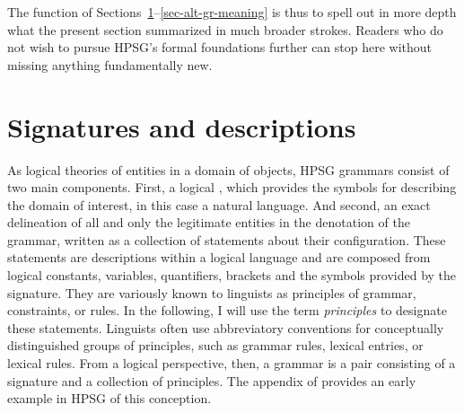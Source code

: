 \documentclass[output=paper,biblatex,babelshorthands,newtxmath,draftmode,colorlinks,citecolor=brown]{langscibook}
\begin{document}
{The function of Sections~\ref{sec-signatures}--\ref{sec-alt-gr-meaning}
is thus to spell out in more depth what the present section summarized
in much broader strokes. Readers who do not wish to pursue HPSG's
formal foundations further
can stop here without missing anything fundamentally new.


\section{Signatures and descriptions}
\label{sec-signatures}

\largerpage[-1]
As logical theories of entities in a domain of objects, HPSG grammars
consist of two main components. First, a logical , which
provides the symbols for describing the domain of interest, in this
case a natural language. And second, an exact delineation of all and
only the legitimate entities in the denotation of the grammar, written
as a collection of statements about their configuration. These statements are
descriptions within a logical language and are composed from logical
constants, variables, quantifiers, brackets and the symbols provided
by the signature. They are variously known to linguists as principles
of grammar, constraints, or rules. In the following, I will use the
term \emph{principles} to designate these statements.
Linguists often use abbreviatory
conventions for conceptually distinguished groups of principles, such
as grammar rules, lexical entries, or lexical rules. From a logical
perspective,
then, a grammar is a pair consisting of a signature and a collection
of principles.  The appendix of \citet{PollardSag1994} provides an
early example in HPSG of this conception.

}
\end{document}

